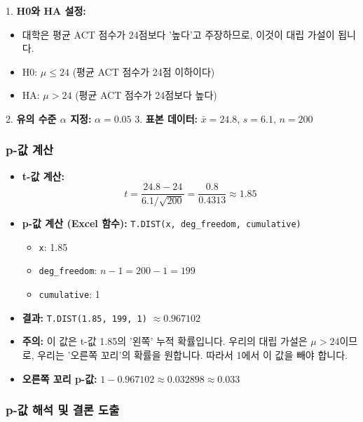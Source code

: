 \documentclass[11pt,a4paper]{book}
\theoremstyle{definition}
\begin{document}
1.  \textbf{H0와 HA 설정:}
    \begin{itemize}
        \item 대학은 평균 ACT 점수가 24점보다 '높다'고 주장하므로, 이것이 대립 가설이 됩니다.
        \item H0: $\mu \le 24$ (평균 ACT 점수가 24점 이하이다)
        \item HA: $\mu > 24$ (평균 ACT 점수가 24점보다 높다)
    \end{itemize}
2.  \textbf{유의 수준 $\alpha$ 지정:} $\alpha = 0.05$
3.  \textbf{표본 데이터:} $\bar{x} = 24.8$, $s = 6.1$, $n = 200$

\subsubsection*{p-값 계산}

\begin{itemize}
    \item \textbf{t-값 계산:}
    \[ t = \frac{24.8 - 24}{6.1 / \sqrt{200}} = \frac{0.8}{0.4313} \approx 1.85 \]
    \item \textbf{p-값 계산 (Excel 함수):} \texttt{T.DIST(x, deg\_freedom, cumulative)}
        \begin{itemize}
            \item \texttt{x}: 1.85
            \item \texttt{deg\_freedom}: $n-1 = 200-1 = 199$
            \item \texttt{cumulative}: 1
        \end{itemize}
    \item \textbf{결과:} \texttt{T.DIST(1.85, 199, 1)} $\approx 0.967102$
    \item \textbf{주의:} 이 값은 t-값 1.85의 '왼쪽' 누적 확률입니다. 우리의 대립 가설은 $\mu > 24$이므로, 우리는 '오른쪽 꼬리'의 확률을 원합니다. 따라서 1에서 이 값을 빼야 합니다.
    \item \textbf{오른쪽 꼬리 p-값:} $1 - 0.967102 \approx 0.032898 \approx 0.033$
\end{itemize}

\subsubsection*{p-값 해석 및 결론 도출}
\end{document}
